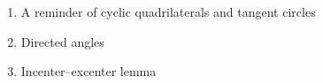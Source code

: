 \documentclass[11pt,paper=letter]{scrartcl}
\begin{document}
\begin{enumerate}
  \item A reminder of cyclic quadrilaterals and tangent circles




  \item Directed angles




  \item Incenter--excenter lemma

  

\end{enumerate}
\end{document}

